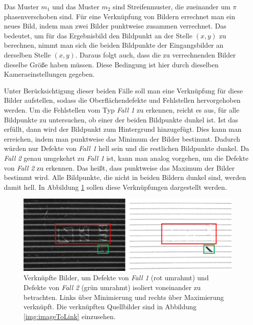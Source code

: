 \p
Das Muster $m_1$ und das Muster $m_2$ sind Streifenmuster, die zueinander um $ \pi $ phasenverschoben sind.
Für eine Verknüpfung von Bildern errechnet man ein neues Bild, indem man zwei Bilder punktweise zusammen verrechnet.
Das bedeutet, um für das Ergebnisbild den Bildpunkt an der Stelle $ (x,y) $ zu berechnen, nimmt man sich die beiden Bildpunkte der Eingangsbilder an derselben Stelle $ (x,y) $.
Daraus folgt auch, dass die zu verrechnenden Bilder dieselbe Größe haben müssen.
Diese Bedingung ist hier durch dieselben Kameraeinstellungen gegeben.


\p
Unter Berücksichtigung dieser beiden Fälle soll man eine Verknüpfung für diese Bilder aufstellen, sodass die Oberflächendefekte und Fehlstellen hervorgehoben werden.
Um die Fehlstellen vom Typ \textit{Fall 1} zu erkennen, reicht es aus, für alle Bildpunkte zu untersuchen, ob einer der beiden Bildpunkte dunkel ist.
Ist das erfüllt, dann wird der Bildpunkt zum Hintergrund hinzugefügt.
Dies kann man erreichen, indem man punktweise das Minimum der Bilder bestimmt.
Dadurch würden nur Defekte von \textit{Fall 1} hell sein und die restlichen Bildpunkte dunkel.
Da \textit{Fall 2} genau umgekehrt zu \textit{Fall 1} ist, kann man analog vorgehen, um die Defekte von \textit{Fall 2} zu erkennen.
Das heißt, dass punktweise das Maximum der Bilder bestimmt wird.
Alle Bildpunkte, die nicht in beiden Bildern dunkel sind, werden damit hell.
In Abbildung \ref{img:minAndMaxLink} sollen diese Verknüpfungen dargestellt werden.

\begin{figure}[H]
	\centering
	\includegraphics[width=\textwidth]{03_sichtpruefungDurchLichtstreuung/einsatzVonMehrerenStreifenmustern/figures/minAndMaxLink}
	\caption[Verknüpfte Bilder über Minimierung und Maximierung]{Verknüpfte Bilder, um Defekte von \textit{Fall 1} (rot umrahmt) und Defekte von \textit{Fall 2} (grün umrahmt) isoliert voneinander zu betrachten. Links über Minimierung und rechts über Maximierung verknüpft. Die verknüpften Quellbilder sind in Abbildung \ref{img:imageToLink} einzusehen.}
	\label{img:minAndMaxLink}
\end{figure}

